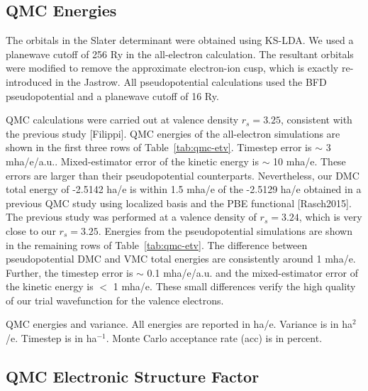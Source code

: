 \documentclass[aps,prl,superscriptaddress]{revtex4-1}
\begin{document}
\subsection{QMC Energies}

The orbitals in the Slater determinant were obtained using KS-LDA. We used a planewave cutoff of 256 Ry in the all-electron calculation. The resultant orbitals were modified to remove the approximate electron-ion cusp, which is exactly re-introduced in the Jastrow. All pseudopotential calculations used the BFD pseudopotential and a planewave cutoff of 16 Ry.

QMC calculations were carried out at valence density $r_s=3.25$, consistent with the previous study [Filippi]. 
QMC energies of the all-electron simulations are shown in the first three rows of Table~\ref{tab:qmc-etv}. Timestep error is $\sim$ 3 mha/e/a.u.. Mixed-estimator error of the kinetic energy is $\sim$ 10 mha/e. These errors are larger than their pseudopotential counterparts. Nevertheless, our DMC total energy of -2.5142 ha/e is within 1.5 mha/e of the -2.5129 ha/e obtained in a previous QMC study using localized basis and the PBE functional [Rasch2015]. The previous study was performed at a valence density of $r_s=3.24$, which is very close to our $r_s=3.25$.
Energies from the pseudopotential simulations are shown in the remaining rows of Table~\ref{tab:qmc-etv}. The difference between pseudopotential DMC and VMC total energies are consistently around 1 mha/e. Further, the timestep error is $\sim$ 0.1 mha/e/a.u. and the mixed-estimator error of the kinetic energy is $<$ 1 mha/e. These small differences verify the high quality of our trial wavefunction for the valence electrons.

\begin{table}[h]

\caption{QMC energies and variance. All energies are reported in ha/e. Variance is in ha$^2$/e. Timestep is in ha$^{-1}$. Monte Carlo acceptance rate (acc) is in percent.\label{tab:qmc-etv}}
\end{table}


\subsection{QMC Electronic Structure Factor}
\end{document}
